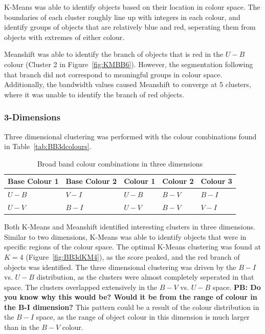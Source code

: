 K-Means was able to identify objects based on their location in colour space.
The boundaries of each cluster roughly line up with integers in each colour, and identify groups of objects that are relatively blue and red, seperating them from objects with extremes of either colour.

Meanshift was able to identify the branch of objects that is red in the $U - B$ colour (Cluster 2 in Figure~\ref{fig:KMBB6}).
However, the segmentation following that branch did not correspond to meaningful groups in colour space.
Additionally, the bandwidth values caused Meanshift to converge at 5 clusters, where it was unable to identify the branch of red objects.

\subsubsection{3-Dimensions}
Three dimensional clustering was performed with the colour combinations found in Table~\ref{tab:BB3dcolours}.

\begin{table}
\centering
\caption{Broad band colour combinations in three dimensions}
\label{tab:BBcolours}
\begin{tabular}{lllll}
\hline\hline
Base Colour 1 & Base Colour 2 & Colour 1 & Colour 2 & Colour 3 \\
\hline
$U - B$ & $V - I$ & $U - B$ & $B - V$ & $B - I$ \\
$U - V$ & $B - I$ & $U - V$ & $B - V$ & $V - I$ \\
\hline
\end{tabular}
\end{table}

Both K-Means and Meanshift identified interesting clusters in three dimensions. 
Similar to two dimensions, K-Means was able to identify objects that were in specific regions of the colour space.
The optimal K-Means clustering was found at $K=4$ (Figure~\ref{fig:BB3dKM4}), as the score peaked, and the red branch of objects was identified.
The three dimensional clustering was driven by the $B - I$ vs. $U - B$ distribution, as the clusters were almost completely seperated in that space.
The clusters overlapped extensively in the $B - V$ vs. $U - B$ space. \textbf{PB: Do you know why this would be? Would it be from the range of colour in the B-I dimension?}
This pattern could be a result of the colour distribution in the $B - I$ space, as the range of object colour in this dimension is much larger than in the $B - V$ colour.

